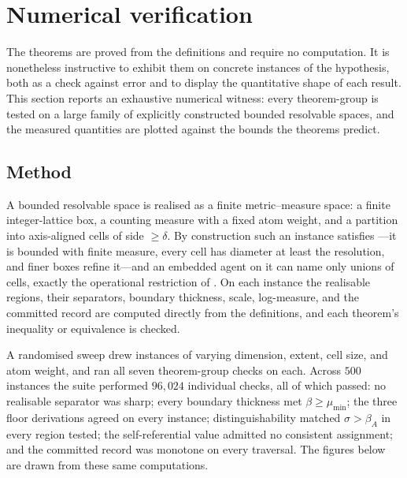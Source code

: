 \documentclass[11pt,twocolumn,a4paper]{article}
\theoremstyle{thmstyle}
\theoremstyle{definition}
\theoremstyle{remark}
\newcommand{\thick}{\beta}
\newcommand{\reso}{\delta}
\begin{document}
\section{Numerical verification}
\label{sec:numerical}

The theorems are proved from the definitions and require no computation. It is
nonetheless instructive to exhibit them on concrete instances of the hypothesis,
both as a check against error and to display the quantitative shape of each
result. This section reports an exhaustive numerical witness: every theorem-group
is tested on a large family of explicitly constructed bounded resolvable spaces,
and the measured quantities are plotted against the bounds the theorems predict.

\subsection{Method}

A bounded resolvable space is realised as a finite metric--measure space: a finite
integer-lattice box, a counting measure with a fixed atom weight, and a partition
into axis-aligned cells of side $\ge\reso$. By construction such an instance
satisfies ---it is bounded with finite measure, every cell has
diameter at least the resolution, and finer boxes refine it---and an embedded
agent on it can name only unions of cells, exactly the operational restriction of
. On each instance the realisable regions, their separators,
boundary thickness, scale, log-measure, and the committed record are computed
directly from the definitions, and each theorem's inequality or equivalence is
checked.

A randomised sweep drew instances of varying dimension, extent, cell size, and
atom weight, and ran all seven theorem-group checks on each. Across
$500$ instances the suite performed $96{,}024$ individual checks, all of which
passed: no realisable separator was sharp; every boundary thickness met
$\thick\ge\mu_{\min}$; the three floor derivations agreed on every instance;
distinguishability matched $\sigma>\thick_A$ in every region tested; the
self-referential value admitted no consistent assignment; and the committed
record was monotone on every traversal. The figures below are drawn from these
same computations.


\end{document}
